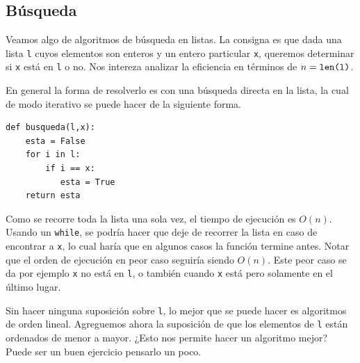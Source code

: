 \documentclass[a4paper, 12pt]{report}
\newcommand{\te}{\text}
\theoremstyle{definition}
\begin{document}
\subsection{Búsqueda}\label{sec-busqueda}

Veamos algo de algoritmos de búsqueda en listas. La consigna es que dada una lista {\tt l} cuyos elementos son enteros y un entero particular {\tt x}, queremos determinar si {\tt x} está en {\tt l} o no. Nos intereza analizar la eficiencia en términos de $n=\te{{\tt len(l)}}$.

En general la forma de resolverlo es con una búsqueda directa en la lista, la cual de modo iterativo se puede hacer de la siguiente forma.
\begin{verbatim}
def busqueda(l,x):
    esta = False
    for i in l:
        if i == x:
           esta = True
    return esta
\end{verbatim}
Como se recorre toda la lista una sola vez, el tiempo de ejecución es $O(n)$. Usando un {\tt while}, se podría hacer que deje de recorrer la lista en caso de encontrar a {\tt x}, lo cual haría que en algunos casos la función termine antes. Notar que el orden de ejecución en peor caso seguiría siendo $O(n)$. Este peor caso se da por ejemplo {\tt x} no está en {\tt l}, o también cuando {\tt x} está pero solamente en el último lugar.

Sin hacer ninguna suposición sobre {\tt l}, lo mejor que se puede hacer es algoritmos de orden lineal. Agreguemos ahora la suposición de que los elementos de {\tt l} están ordenados de menor a mayor. ¿Esto nos permite hacer un algoritmo mejor? Puede ser un buen ejercicio pensarlo un poco.
\end{document}
